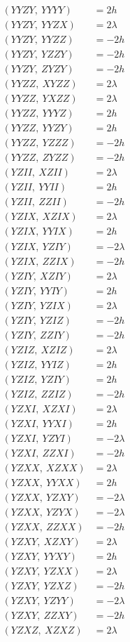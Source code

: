 \documentclass{article}
\begin{document}
\begin{align*}
  (YYZY,\ YYYY) &= 2 h \\
  (YYZY,\ YYZX) &= 2 \lambda \\
  (YYZY,\ YYZZ) &= - 2 h \\
  (YYZY,\ YZZY) &= - 2 h \\
  (YYZY,\ ZYZY) &= - 2 h \\
  (YYZZ,\ XYZZ) &= 2 \lambda \\
  (YYZZ,\ YXZZ) &= 2 \lambda \\
  (YYZZ,\ YYYZ) &= 2 h \\
  (YYZZ,\ YYZY) &= 2 h \\
  (YYZZ,\ YZZZ) &= - 2 h \\
  (YYZZ,\ ZYZZ) &= - 2 h \\
  (YZII,\ XZII) &= 2 \lambda \\
  (YZII,\ YYII) &= 2 h \\
  (YZII,\ ZZII) &= - 2 h \\
  (YZIX,\ XZIX) &= 2 \lambda \\
  (YZIX,\ YYIX) &= 2 h \\
  (YZIX,\ YZIY) &= - 2 \lambda \\
  (YZIX,\ ZZIX) &= - 2 h \\
  (YZIY,\ XZIY) &= 2 \lambda \\
  (YZIY,\ YYIY) &= 2 h \\
  (YZIY,\ YZIX) &= 2 \lambda \\
  (YZIY,\ YZIZ) &= - 2 h \\
  (YZIY,\ ZZIY) &= - 2 h \\
  (YZIZ,\ XZIZ) &= 2 \lambda \\
  (YZIZ,\ YYIZ) &= 2 h \\
  (YZIZ,\ YZIY) &= 2 h \\
  (YZIZ,\ ZZIZ) &= - 2 h \\
  (YZXI,\ XZXI) &= 2 \lambda \\
  (YZXI,\ YYXI) &= 2 h \\
  (YZXI,\ YZYI) &= - 2 \lambda \\
  (YZXI,\ ZZXI) &= - 2 h \\
  (YZXX,\ XZXX) &= 2 \lambda \\
  (YZXX,\ YYXX) &= 2 h \\
  (YZXX,\ YZXY) &= - 2 \lambda \\
  (YZXX,\ YZYX) &= - 2 \lambda \\
  (YZXX,\ ZZXX) &= - 2 h \\
  (YZXY,\ XZXY) &= 2 \lambda \\
  (YZXY,\ YYXY) &= 2 h \\
  (YZXY,\ YZXX) &= 2 \lambda \\
  (YZXY,\ YZXZ) &= - 2 h \\
  (YZXY,\ YZYY) &= - 2 \lambda \\
  (YZXY,\ ZZXY) &= - 2 h \\
  (YZXZ,\ XZXZ) &= 2 \lambda
\end{align*}
\end{document}
